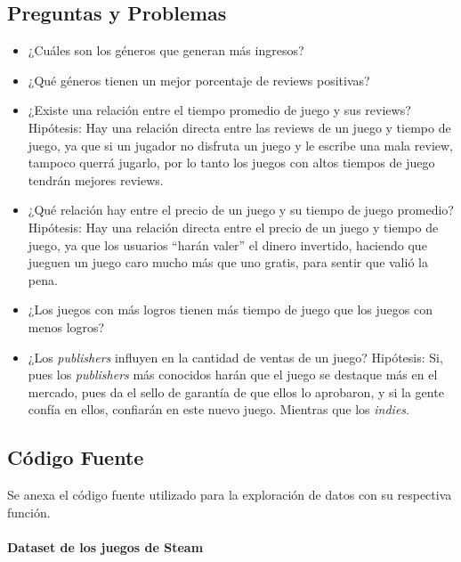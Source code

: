 \documentclass[
]{article}
\begin{document}
\hypertarget{preguntas-y-problemas}{%
\subsection{Preguntas y Problemas}\label{preguntas-y-problemas}}

\begin{itemize}
\item
  ¿Cuáles son los géneros que generan más ingresos?
\item
  ¿Qué géneros tienen un mejor porcentaje de reviews positivas?
\item
  ¿Existe una relación entre el tiempo promedio de juego y sus reviews?
  Hipótesis: Hay una relación directa entre las reviews de un juego y
  tiempo de juego, ya que si un jugador no disfruta un juego y le
  escribe una mala review, tampoco querrá jugarlo, por lo tanto los
  juegos con altos tiempos de juego tendrán mejores reviews.
\item
  ¿Qué relación hay entre el precio de un juego y su tiempo de juego
  promedio? Hipótesis: Hay una relación directa entre el precio de un
  juego y tiempo de juego, ya que los usuarios ``harán valer'' el dinero
  invertido, haciendo que jueguen un juego caro mucho más que uno
  gratis, para sentir que valió la pena.
\item
  ¿Los juegos con más logros tienen más tiempo de juego que los juegos
  con menos logros?
\item
  ¿Los \emph{publishers} influyen en la cantidad de ventas de un juego?
  Hipótesis: Si, pues los \emph{publishers} más conocidos harán que el
  juego se destaque más en el mercado, pues da el sello de garantía de
  que ellos lo aprobaron, y si la gente confía en ellos, confiarán en
  este nuevo juego. Mientras que los \emph{indies}.\\
\end{itemize}

\hypertarget{cuxf3digo-fuente}{%
\subsection{Código Fuente}\label{cuxf3digo-fuente}}

Se anexa el código fuente utilizado para la exploración de datos con su
respectiva función.

\hypertarget{dataset-de-los-juegos-de-steam}{%
\paragraph{Dataset de los juegos de
Steam}\label{dataset-de-los-juegos-de-steam}}
\end{document}
